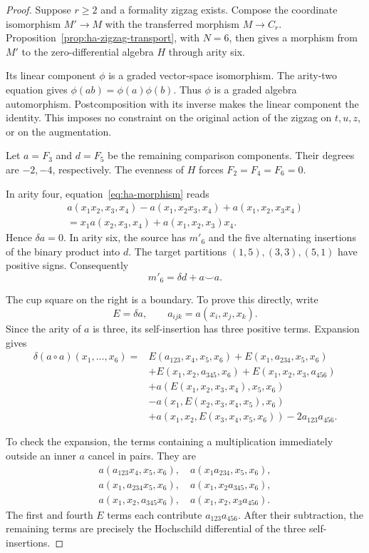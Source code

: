 \begin{proof}
Suppose $r\geq2$ and a formality zigzag exists. Compose the
coordinate isomorphism $M'\to M$ with the transferred morphism
$M\to C_r$. Proposition~\ref{prop:ha-zigzag-transport}, with $N=6$,
then gives a morphism from $M'$ to the zero-differential algebra $H$
through arity six.

Its linear component $\phi$ is a graded vector-space isomorphism.
The arity-two equation gives $\phi(ab)=\phi(a)\phi(b)$.
Thus $\phi$ is a graded algebra automorphism. Postcomposition with
its inverse makes the linear component the identity.
This imposes no constraint on the original action of the zigzag
on $t,u,z$, or on the augmentation.

Let $a=F_3$ and $d=F_5$ be the remaining comparison components.
Their degrees are $-2,-4$, respectively. The evenness of $H$ forces
$F_2=F_4=F_6=0$.

In arity four, equation~\eqref{eq:ha-morphism} reads
\[
 \begin{split}
 a(x_1x_2,x_3,x_4)-a(x_1,x_2x_3,x_4)
 +a(x_1,x_2,x_3x_4)\\
 =x_1a(x_2,x_3,x_4)+a(x_1,x_2,x_3)x_4.
 \end{split}
\]
Hence $\delta a=0$.
In arity six, the source has $m'_6$ and the five alternating
insertions of the binary product into $d$.
The target partitions $(1,5),(3,3),(5,1)$ have positive signs.
Consequently
\begin{equation}\label{eq:ha-formality-comparison}
 m'_6=\delta d+a\smile a.
\end{equation}

The cup square on the right is a boundary. To prove this directly,
write
\[
 E=\delta a,\qquad a_{ijk}=a(x_i,x_j,x_k).
\]
Since the arity of $a$ is three, its self-insertion has three
positive terms. Expansion gives
\[
 \begin{split}
 \delta(a\circ a)(x_1,\ldots,x_6)
 ={}&E(a_{123},x_4,x_5,x_6)
     +E(x_1,a_{234},x_5,x_6)\\
 &+E(x_1,x_2,a_{345},x_6)
     +E(x_1,x_2,x_3,a_{456})\\
 &+a(E(x_1,x_2,x_3,x_4),x_5,x_6)\\
 &-a(x_1,E(x_2,x_3,x_4,x_5),x_6)\\
 &+a(x_1,x_2,E(x_3,x_4,x_5,x_6))
     -2a_{123}a_{456}.
 \end{split}
\]

To check the expansion, the terms containing a multiplication
immediately outside an inner $a$ cancel in pairs. They are
\[
 \begin{gathered}
 a(a_{123}x_4,x_5,x_6),\quad a(x_1a_{234},x_5,x_6),\\
 a(x_1,a_{234}x_5,x_6),\quad a(x_1,x_2a_{345},x_6),\\
 a(x_1,x_2,a_{345}x_6),\quad a(x_1,x_2,x_3a_{456}).
 \end{gathered}
\]
The first and fourth $E$ terms each contribute $a_{123}a_{456}$.
After their subtraction, the remaining terms are precisely the
Hochschild differential of the three self-insertions.


\end{proof}
